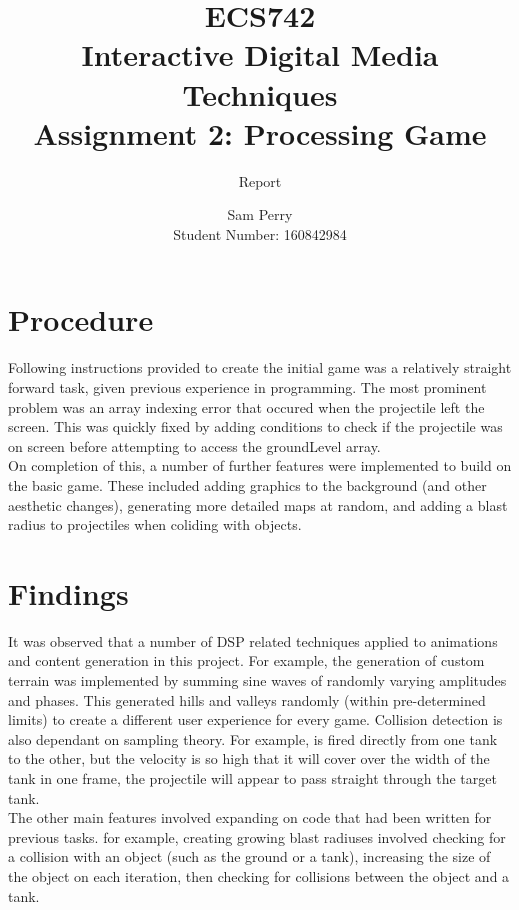 \documentclass[titlepage]{scrartcl}
\begin{document}
    \title{ECS742\\Interactive Digital Media Techniques\\Assignment 2: Processing Game}
    \subtitle{\LARGE{Report}}
    \author{Sam Perry\\Student Number: 160842984}
    \date{}

    \maketitle


    \section*{Procedure}
    Following instructions provided to create the initial game was a relatively
    straight forward task, given previous experience in programming. The most
    prominent problem was an array indexing error that occured when the
    projectile left the screen. This was quickly fixed by adding conditions to
    check if the projectile was on screen before attempting to access the
    groundLevel array.\\


    On completion of this, a number of further features were implemented to
    build on the basic game. These included adding graphics to the background
    (and other aesthetic changes), generating more detailed maps at random, and
    adding a blast radius to projectiles when coliding with objects.

    \section*{Findings}
    It was observed that a number of DSP related techniques applied to
    animations and content generation in this project.
    For example, the generation of custom terrain was implemented by summing
    sine waves of randomly varying amplitudes and phases. This generated hills
    and valleys randomly (within pre-determined limits) to create a different
    user experience for every game. Collision detection is also dependant on
    sampling theory. For example, is fired directly from one tank to the other,
    but the velocity is so high that it will cover over the width of the tank
    in one frame, the projectile will appear to pass straight through the
    target tank.\\

    The other main features involved expanding on code that had been written
    for previous tasks. for example, creating growing blast radiuses involved
    checking for a collision with an object (such as the ground or a tank),
    increasing the size of the object on each iteration, then checking for
    collisions between the object and a tank.\\
    
\end{document}

